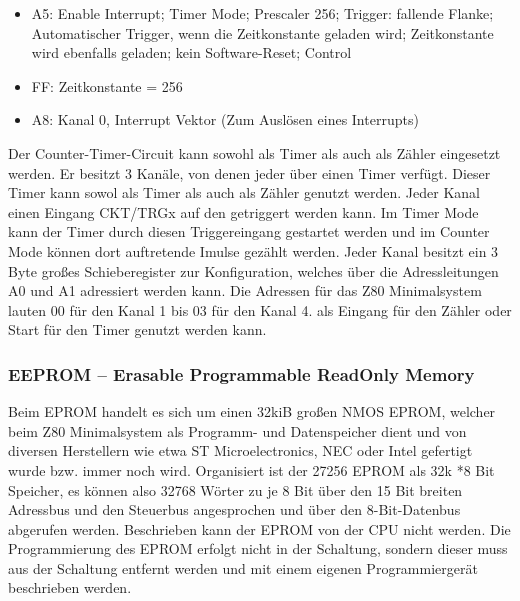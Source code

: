 \begin{itemize}
    \item A5: Enable Interrupt; Timer Mode; Prescaler 256; Trigger: fallende Flanke; Automatischer Trigger, wenn die Zeitkonstante geladen wird; Zeitkonstante wird ebenfalls geladen; kein Software-Reset; Control\\
    \item FF: Zeitkonstante = 256
    \item A8: Kanal 0, Interrupt Vektor (Zum Auslösen eines Interrupts)
\end{itemize}

Der Counter-Timer-Circuit kann sowohl als Timer als auch als Zähler eingesetzt werden. Er besitzt 3 Kanäle, von denen jeder über einen Timer verfügt. Dieser Timer kann sowol als Timer als auch als Zähler genutzt werden. Jeder Kanal einen Eingang CKT/TRGx auf den getriggert werden kann. Im Timer Mode kann der Timer durch diesen Triggereingang gestartet werden und im Counter Mode können dort auftretende Imulse gezählt werden. Jeder Kanal besitzt ein 3 Byte großes Schieberegister zur Konfiguration, welches über die Adressleitungen A0 und A1 adressiert werden kann. Die Adressen für das Z80 Minimalsystem lauten 00 für den Kanal 1 bis 03 für den Kanal 4. als Eingang für den Zähler oder Start für den Timer genutzt werden kann.

\subsubsection{EEPROM -- Erasable Programmable ReadOnly Memory}

Beim EPROM handelt es sich um einen 32kiB großen NMOS EPROM, welcher beim Z80 Minimalsystem als Programm- und Datenspeicher dient und von diversen Herstellern wie etwa ST Microelectronics, NEC oder Intel gefertigt wurde bzw. immer noch wird. Organisiert ist der 27256 EPROM als 32k *8 Bit Speicher, es können also 32768 Wörter zu je 8 Bit über den 15 Bit breiten Adressbus und den Steuerbus angesprochen und über den 8-Bit-Datenbus abgerufen werden. Beschrieben kann der EPROM von der CPU nicht werden. Die Programmierung des EPROM erfolgt nicht in der Schaltung, sondern dieser muss aus der Schaltung entfernt werden und mit einem eigenen Programmiergerät beschrieben werden.


